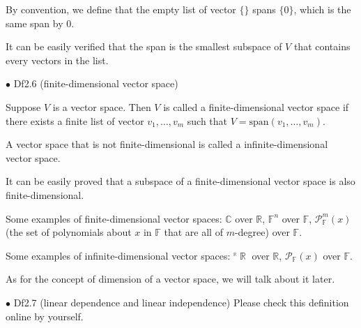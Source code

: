\documentclass{article}
\begin{document}
\begin{Rmk}{}
    \begin{compactenum}
        \item By convention, \textcolor{Df}{we define that the empty list of vector $\{\}$ spans $\{0\}$, which is the same span by $0$.}
        \item It can be easily verified that \textcolor{Th}{the span is the smallest subspace of $V$ that contains every vectors in the list.}
    \end{compactenum}
\end{Rmk}

\begin{Df}{$\bullet$ Df2.6 (finite-dimensional vector space)}
    \begin{compactitem}
        \item Suppose $V$ is a vector space. Then $V$ is called a finite-dimensional vector space if there exists a finite list of vector $v_1, \dots, v_m$ such that $V = \text{span}(v_1, \dots, v_m)$.
        \item A vector space that is not finite-dimensional is called a infinite-dimensional vector space.
    \end{compactitem}
\end{Df}

\begin{Rmk}{}
    \begin{compactitem}
        \item \textcolor{Th}{It can be easily proved that a subspace of a finite-dimensional vector space is also finite-dimensional.}
        \item \textcolor{Th}{Some examples of finite-dimensional vector spaces: $\mathbb{C}$ over $\mathbb{R}$, $\mathbb{F}^n$ over $\mathbb{F}$, $\mathcal{P}_\mathbb{F}^m (x)$ } \textcolor{Df}{(the set of polynomials about $x$ in $\mathbb{F}$ that are all of $m$-degree)} \textcolor{Th}{over $\mathbb{F}$.}
        \item \textcolor{Th}{Some examples of infinite-dimensional vector spaces: $\overset{^\mathbb{R}}{}{\mathop{\mathbb{R}}}$ over $\mathbb{R}$, $\mathcal{P}_\mathbb{F}(x)$ over $\mathbb{F}$.}
        \item As for the concept of dimension of a vector space, we will talk about it later.
    \end{compactitem}
\end{Rmk}

\begin{Df}{$\bullet$ Df2.7 (linear dependence and linear independence)}
    Please check this definition online by yourself.
\end{Df}
\end{document}
